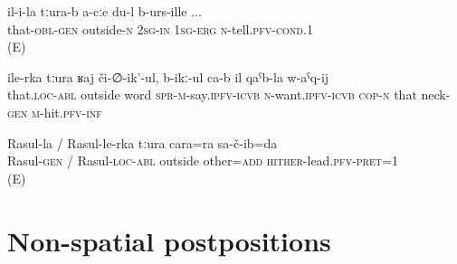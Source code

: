\begin{exe}
	\ex
	\begin{xlist}
		\ex	\label{If I can tell you now (something else) apart from this}
		\gll	il-i-la	tːura-b	a-cːe	du-l	b-urs-ille  ...\\
			that-\textsc{obl}-\textsc{gen}	outside-\textsc{n}	2\textsc{sg}-\textsc{in}	1\textsc{sg}-\textsc{erg}	\textsc{n}-tell.\textsc{pfv}-\textsc{cond}.1\\
		\glt	{} (E)

		\ex	\label{Moreover, he defamed (him) and wanted (him) to be beheaded}
		\gll	ile-rka tːura		ʁaj	či-∅-ik'-ul,	b-ikː-ul ca-b	il	qaˁb-la	w-aˁq-ij\\
			that.\textsc{loc}-\textsc{abl}	outside	word	\textsc{spr}-\textsc{m}-say.\textsc{ipfv}-\textsc{icvb}	\textsc{n}-want.\textsc{ipfv}-\textsc{icvb} \textsc{cop-n}	that	neck-\textsc{gen}	\textsc{m}-hit.\textsc{pfv}-\textsc{inf}\\
		\glt	{}

		\ex	\label{Apart from Rasul I also brought another one}
		\gll	Rasul-la	/	Rasul-le-rka	tːura	cara=ra	sa-č-ib=da  \\
			Rasul-\textsc{gen}	/ Rasul-\textsc{loc}-\textsc{abl}	outside	other=\textsc{add}	\textsc{hither}-lead.\textsc{pfv}-\textsc{pret}=1\\
		\glt	{} (E)
	\end{xlist}
\end{exe}



\section{Non-spatial postpositions}
\label{sec:Non-spatial postpositions}



\subsection{ }
\label{ssec:postposition balli}

